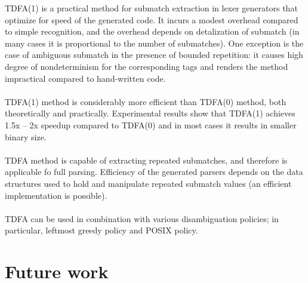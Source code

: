 \documentclass{article}
\theoremstyle{definition}
\begin{document}
\begin{multicols}{2}
TDFA(1) is a practical method for submatch extraction in lexer generators that optimize for speed of the generated code.
It incurs a modest overhead compared to simple recognition,
and the overhead depends on detalization of submatch
(in many cases it is proportional to the number of submatches).
One exception is the case of ambiguous submatch in the presence of bounded repetition:
it causes high degree of nondeterminism for the corresponding tags
and renders the method impractical compared to hand-written code.
\\ \\
TDFA(1) method is considerably more efficient than TDFA(0) method, both theoretically and practically.
Experimental results show that TDFA(1) achieves 1.5x -- 2x speedup compared to TDFA(0)
and in most cases it results in smaller binary size.
\\ \\
TDFA method is capable of extracting repeated submatches,
and therefore is applicable fo full parsing.
Efficiency of the generated parsers depends on the data structures used to hold and manipulate repeated submatch values
(an efficient implementation is possible).
\\ \\
TDFA can be used in combination with various disambiguation policies;
in particular, leftmost greedy policy and POSIX policy.


\section{Future work}\label{section_future_work}


\end{multicols}
\end{document}
